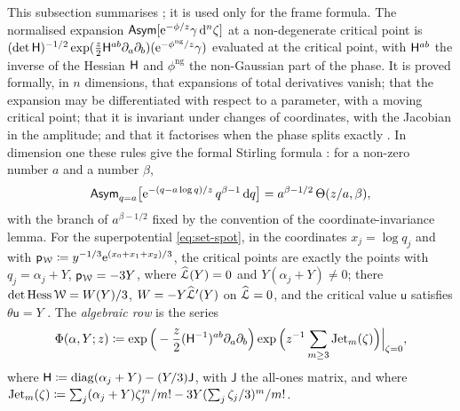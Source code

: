 This subsection summarises ; it is used only for the frame formula. The normalised expansion $\mathsf{Asym}[\mathrm{e}^{-\phi/z}\gamma\,\mathrm{d}^n\zeta]$ at a non-degenerate critical point is $(\det\mathsf{H})^{-1/2}\exp(\frac z2\mathsf{H}^{ab}\partial_a\partial_b)(\mathrm{e}^{-\phi^{\mathrm{ng}}/z}\gamma)$ evaluated at the critical point, with $\mathsf{H}^{ab}$ the inverse of the Hessian $\mathsf{H}$ and $\phi^{\mathrm{ng}}$ the non-Gaussian part of the phase. It is proved formally, in $n$ dimensions, that expansions of total derivatives vanish; that the expansion may be differentiated with respect to a parameter, with a moving critical point; that it is invariant under changes of coordinates, with the Jacobian in the amplitude; and that it factorises when the phase splits exactly . In dimension one these rules give the formal Stirling formula : for a non-zero number $a$ and a number $\beta$,
\begin{equation}
\label{eq:row-stirling}
\mathsf{Asym}_{q=a}\big[\mathrm{e}^{-(q-a\log q)/z}\,q^{\beta-1}\,\mathrm{d} q\big]=a^{\beta-1/2}\,\Theta(z/a,\beta),
\end{equation}
with the branch of $a^{\beta-1/2}$ fixed by the convention of the coordinate-invariance lemma. For the superpotential \eqref{eq:set-spot}, in the coordinates $x_j=\log q_j$ and with $\mathsf{p}_{\mathcal{W}}\coloneqq y^{-1/3}\mathrm{e}^{(x_0+x_1+x_2)/3}$, the critical points are exactly the points with $q_j=\alpha_j+Y$, $\mathsf{p}_{\mathcal{W}}=-3Y$, where $\widehat{\mathcal{L}}(Y)=0$ and $Y(\alpha_j+Y)\neq0$; there $\det\mathrm{Hess}\,\mathcal{W}=W(Y)/3$, $W=-Y\widehat{\mathcal{L}}'(Y)$ on $\widehat{\mathcal{L}}=0$, and the critical value $\mathsf{u}$ satisfies $\theta\mathsf{u}=Y$ . The \emph{algebraic row} is the series
\begin{equation}
\label{eq:row-Phi}
\Phi(\alpha,Y;z)\coloneqq\exp\Big(-\frac z2(\mathsf{H}^{-1})^{ab}\partial_a\partial_b\Big)\exp\Big(z^{-1}\sum_{m\geq3}\mathrm{Jet}_m(\zeta)\Big)\Big|_{\zeta=0},
\end{equation}
where $\mathsf{H}\coloneqq\mathrm{diag}(\alpha_j+Y)-(Y/3)\mathsf{J}$, with $\mathsf{J}$ the all-ones matrix, and where
$\mathrm{Jet}_m(\zeta)\coloneqq\sum_j(\alpha_j+Y)\zeta_j^m/m!-3Y(\sum_j\zeta_j/3)^m/m!$.

